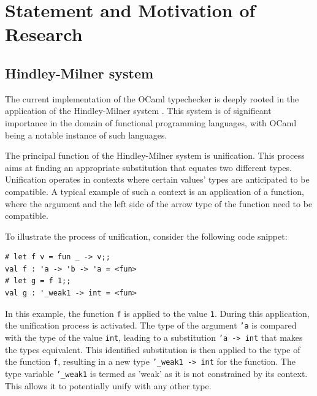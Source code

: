 \documentclass[a4paper,11pt,oneside]{article}
\theoremstyle{definition}
\begin{document}


\section{Statement and Motivation of Research}

\subsection{Hindley-Milner system}

The current implementation of the OCaml typechecker is deeply rooted in the application of the Hindley-Milner system \cite{Hindley_1969} \cite{Milner_1978}. This system is of significant importance in the domain of functional programming languages, with OCaml being a notable instance of such languages.

The principal function of the Hindley-Milner system is unification. This process aims at finding an appropriate substitution that equates two different types. Unification operates in contexts where certain values' types are anticipated to be compatible. A typical example of such a context is an application of a function, where the argument and the left side of the arrow type of the function need to be compatible.

To illustrate the process of unification, consider the following code snippet:

{\ttfamily\begin{verbatim}
# let f v = fun _ -> v;;
val f : 'a -> 'b -> 'a = <fun>
# let g = f 1;;
val g : '_weak1 -> int = <fun>
\end{verbatim}}

In this example, the function \texttt{f} is applied to the value \texttt{1}. During this application, the unification process is activated. The type of the argument \texttt{'a} is compared with the type of the value \texttt{int}, leading to a substitution \texttt{'a -> int} that makes the types equivalent. This identified substitution is then applied to the type of the function \texttt{f}, resulting in a new type \texttt{'\_weak1 -> int} for the function. The type variable \texttt{'\_weak1} is termed as 'weak' as it is not constrained by its context. This allows it to potentially unify with any other type.
\end{document}
